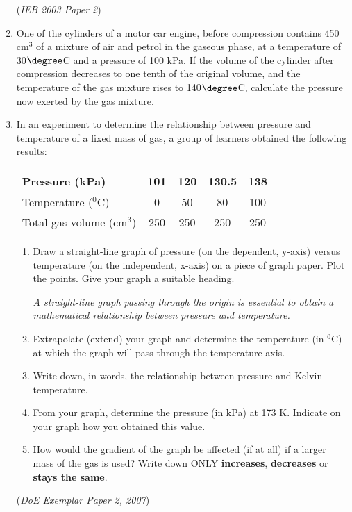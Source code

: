 \begin{eocexercises}{}
\begin{enumerate}
{(\textit{IEB 2003 Paper 2})
}

\item{One of the cylinders of a motor car engine, before compression contains 450 cm$^{3}$ of a mixture of air and petrol in the gaseous phase, at a temperature of 30$\degree$C and a pressure of 100 kPa. If the volume of the cylinder after compression decreases to one tenth of the original volume, and the temperature of the gas mixture rises to 140$\degree$C, calculate the pressure now exerted by the gas mixture.}

\item{In an experiment to determine the relationship between pressure and temperature of a fixed mass of gas, a group of learners obtained the following results:}

\begin{center}
\begin{tabular}{|l|c|c|c|c|}\hline
Pressure (kPa) & 101 & 120 & 130.5 & 138 \\\hline
Temperature ($^{0}$C) & 0 & 50 & 80 & 100 \\\hline
Total gas volume (cm$^{3}$) & 250 & 250 & 250 & 250 \\\hline
\end{tabular}
\end{center}

	\begin{enumerate}
	\item{Draw a straight-line graph of pressure (on the dependent, y-axis) versus temperature (on the independent, x-axis) on a piece of graph paper. Plot the points. Give your graph a suitable heading.}

\textit{A straight-line graph passing through the origin is essential to obtain a mathematical relationship between pressure and temperature.}

	\item{Extrapolate (extend) your graph and determine the temperature (in $^{0}$C) at which the graph will pass through the temperature axis.}
	\item{Write down, in words, the relationship between pressure and Kelvin temperature.}
	\item{From your graph, determine the pressure (in kPa) at 173 K. Indicate on your graph how you obtained this value.}
	\item{How would the gradient of the graph be affected (if at all) if a larger mass of the gas is used? Write down ONLY \textbf{increases}, \textbf{decreases} or \textbf{stays the same}.}
	\end{enumerate}

(\textit{DoE Exemplar Paper 2, 2007})


\end{enumerate}

\practiceinfo
\end{eocexercises}



